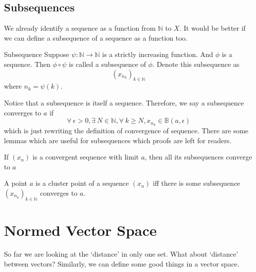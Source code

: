 \documentclass{article}
\begin{document}
\subsection{Subsequences}
We already identify a sequence as a function from $\mathbb{N}$ to $X$. It would be better if we can define a subsequence of a sequence as a function too.
\begin{defin}{Subsequence}
    Suppose $\psi : \mathbb{N} \rightarrow \mathbb{N}$ is a strictly increasing function. And $\phi$ is a sequence. Then $\phi \circ \psi$ is called a subsequence of $\phi$. Denote this subsequence as 
    $$
    (x_{n_k})_{k \in \mathbb{N}}
    $$
    where $n_k = \psi(k)$.
\end{defin}
Notice that a subsequence is itself a sequence. Therefore, we say a subsequence converges to $a$ if 
$$
\forall\ \epsilon > 0, \exists\ N \in \mathbb{N}, \forall\ k \geq N, x_{n_k} \in \mathbb{B}(a, \epsilon)
$$
which is just rewriting the definition of convergence of sequence. There are some lemmas which are useful for subsequences which proofs are left for readers.
\begin{lemma}{ }
    If $(x_n)$ is a convergent sequence with limit $a$, then all its subsequences converge to $a$
\end{lemma}
\begin{lemma}{ }
    A point $a$ is a cluster point of a sequence $(x_n)$ iff there is some subsequence $(x_{n_k})_{k \in \mathbb{N}}$ converges to $a$.
\end{lemma}
\section{Normed Vector Space}
So far we are looking at the `distance' in only one set. What about `distance' between vectors? Similarly, we can define some good things in a vector space.
\end{document}

